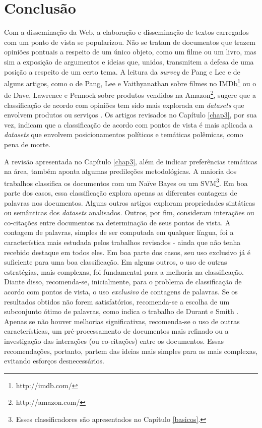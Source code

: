 \chapter{Conclusão}
\label{conclusoes}

Com a disseminação da Web, a elaboração e disseminação de textos carregados com um ponto de vista se popularizou. Não se tratam de documentos que trazem opiniões pontuais a respeito de um único objeto, como um filme ou um livro, mas sim a exposição de argumentos e ideias que, unidos, transmitem a defesa de uma posição a respeito de um certo tema. A leitura da \emph{survey} de Pang e Lee e de alguns artigos, como o de Pang, Lee e Vaithyanathan sobre filmes no IMDb\footnote{http://imdb.com/} ou o de Dave, Lawrence e Pennock sobre produtos vendidos na Amazon\footnote{http://amazon.com/}, sugere que a classificação de acordo com opiniões tem sido mais explorada em \emph{datasets} que envolvem produtos ou serviços \cite{omsa, thumbs-up, peanut-gallery}. Os artigos revisados no Capítulo \ref{chap3}, por sua vez, indicam que a classificação de acordo com pontos de vista é mais aplicada a \emph{datasets} que envolvem posicionamentos políticos e temáticas polêmicas, como pena de morte.

A revisão apresentada no Capítulo \ref{chap3}, além de indicar preferências temáticas na área, também aponta algumas predileções metodológicas. A maioria dos trabalhos classifica os documentos com um Naïve Bayes ou um SVM\footnote{Esses classificadores são apresentados no Capítulo \ref{basicos}.}. Em boa parte dos casos, essa classificação explora apenas as diferentes contagens de palavras nos documentos. Alguns outros artigos exploram propriedades sintáticas ou semânticas dos \emph{datasets} analisados. Outros, por fim, consideram interações ou co-citações entre documentos na determinação de seus pontos de vista. A contagem de palavras, simples de ser computada em qualquer língua, foi a característica mais estudada pelos trabalhos revisados - ainda que não tenha recebido destaque em todos eles. Em boa parte dos casos, seu uso exclusivo já é suficiente para uma boa classificação. Em alguns outros, o uso de outras estratégias, mais complexas, foi fundamental para a melhoria na classificação. Diante disso, recomenda-se, inicialmente, para o problema de classificação de acordo com pontos de vista, o uso \emph{exclusivo} de contagens de palavras. Se os resultados obtidos não forem satisfatórios, recomenda-se a escolha de um subconjunto ótimo de palavras, como indica o trabalho de Durant e Smith \cite{durant-smith}. Apenas se não houver melhorias significativas, recomenda-se o uso de outras características, um pré-processamento de documentos mais refinado ou a investigação das interações (ou co-citações) entre os documentos. Essas recomendações, portanto, partem das ideias mais simples para as mais complexas, evitando esforços desnecessários. 


